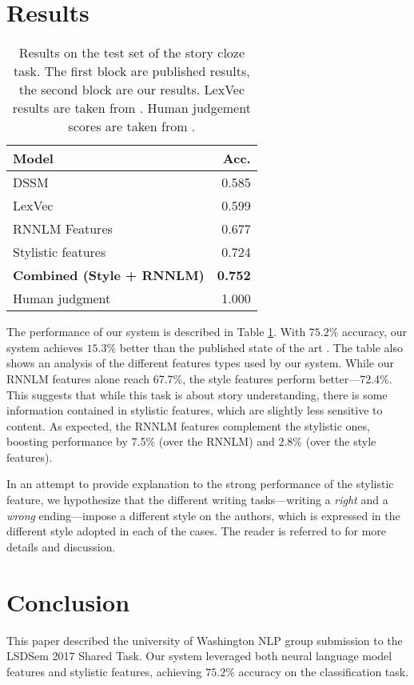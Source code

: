 \documentclass[11pt]{article}
\begin{document}
\section{Results}

\begin{table}%
\begin{center}
\begin{tabular}{|l|r|} \hline
{\bf Model} & {\bf Acc.} \\ \hline
{DSSM} \cite{Mostafazadeh:2016} & 0.585 \\ 
{LexVec} \cite{Salle:2016} & 0.599 \\ \hline\hline
{RNNLM Features}		& 0.677 \\ 
{Stylistic features} & {0.724} \\ 
{\bf Combined (Style + RNNLM)} & {\bf 0.752} \\ \hline\hline
Human judgment & 1.000 \\ \hline
\end{tabular}
\end{center}
\caption{\label{cloze_results}
Results on the test set of the  story cloze task. 
The first block are published results, the second block are our results.
LexVec results are taken from \cite{Speer:2016}.
Human judgement scores are taken from \cite{Mostafazadeh:2016}. 
}
\end{table}

The performance of our system is described in Table \ref{cloze_results}. 
With $75.2\%$ accuracy, our system achieves $15.3\%$ better than the published state of the art \cite{Salle:2016}. 
The table also shows an analysis of the different features types used by our system.
While our RNNLM features alone reach 67.7\%, the style features perform better---72.4\%. 
This suggests that while this task is about story understanding, 
there is some information contained in stylistic features, which are slightly less sensitive to content.
As expected, the RNNLM features complement the stylistic ones, boosting performance by 7.5\% (over the RNNLM) and 2.8\% (over the style features). 

In an attempt to provide explanation to the strong performance of the stylistic feature, 
we hypothesize that the different writing tasks---writing a {\it right} and a {\it wrong} ending---impose a different style on the authors, which is expressed in the different style adopted in each of the cases. 
The reader is referred to \cite{Schwartz:2017} for more details and discussion.


\section{Conclusion}
This paper described the university of Washington NLP group submission to the LSDSem 2017 Shared Task. 
Our system leveraged both neural language model features and  stylistic features, achieving $75.2\%$ accuracy on the classification task. 



\end{document}
